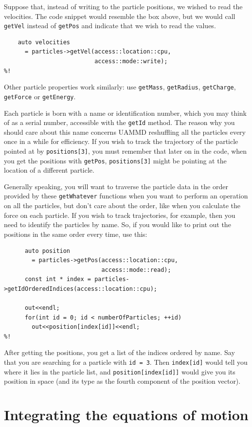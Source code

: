 Suppose that, instead of writing to the particle positions, we wished to read
the velocities. The code snippet would resemble the box above, but we would call
\texttt{getVel} instead of \texttt{getPos} and indicate that we wish to read the
values.
\begin{lstlisting}
    auto velocities
      = particles->getVel(access::location::cpu,
                          access::mode::write);
%!
\end{lstlisting}
Other particle properties work similarly: use \texttt{getMass},
\texttt{getRadius}, \texttt{getCharge}, \texttt{getForce} or \texttt{getEnergy}.

Each particle is born with a name or identification number, which you may think
of as a serial number, accessible with the \texttt{getId} method. The reason why
you should care about this name concerns UAMMD reshuffling all the particles
every once in a while for efficiency. If you wish to track the trajectory of the
particle pointed at by \texttt{positions[3]}, you must remember that later on in
the code, when you get the positions with \texttt{getPos}, \texttt{positions[3]}
might be pointing at the location of a different particle.

Generally speaking, you will want to traverse the particle data in the order
provided by these \texttt{getWhatever} functions when you want to perform an
operation on all the particles, but don't care about the order, like when you
calculate the force on each particle. If you wish to track trajectories, for
example, then you need to identify the particles by name. So, if you would
like to print out the positions in the same order every time, use this:
\label{particlePositions}
\begin{lstlisting}
      auto position
        = particles->getPos(access::location::cpu,
                            access::mode::read);
      const int * index = particles->getIdOrderedIndices(access::location::cpu);

      out<<endl;
      for(int id = 0; id < numberOfParticles; ++id)
        out<<position[index[id]]<<endl;
%!
\end{lstlisting}
After getting the positions, you get a list of the indices ordered by name. Say
that you are searching for a particle with \texttt{id = 3}. Then
\texttt{index[id]} would tell you where it lies in the particle list, and
\texttt{position[index[id]]} would give you its position in space (and its type
as the fourth component of the position vector).

\section{Integrating the equations of motion}


